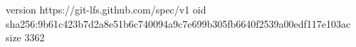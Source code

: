 version https://git-lfs.github.com/spec/v1
oid sha256:9b61c423b7d2a8e51b6c740094a9c7e699b305fb6640f2539a00edf117e103ac
size 3362
